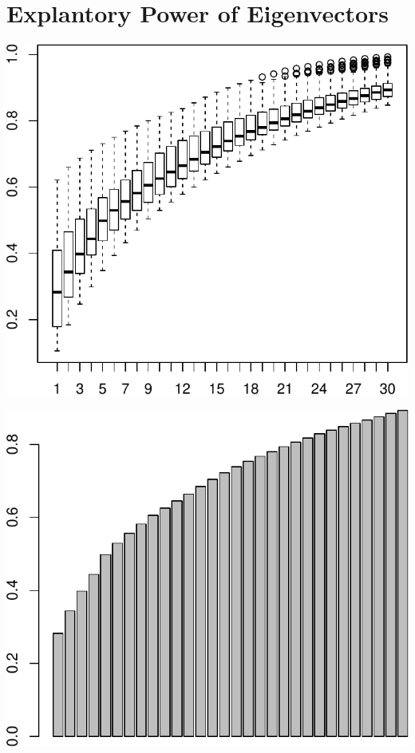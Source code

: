 \documentclass[11pt,]{article}
\begin{document}
\section{Explantory Power of
Eigenvectors}\label{explantory-power-of-eigenvectors}

\begin{center}\includegraphics{AC_US_Bank_Int_Results_1_files/figure-latex/expl_power_eig_vec-1} \end{center}

\begin{center}\includegraphics{AC_US_Bank_Int_Results_1_files/figure-latex/expl_power_eig_vec-2} \end{center}
\end{document}
